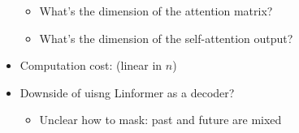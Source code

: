 \documentclass[usenames,dvipsnames,notes,11pt,aspectratio=169,hyperref={colorlinks=true, linkcolor=blue}]{beamer}
\newcommand{\pdfnote}[1]{}
\begin{document}
\begin{frame}
\begin{columns}
\begin{column}{0.7\textwidth}
\begin{itemize}[<+->]
\begin{itemize}
                        \item What's the dimension of the attention matrix?
                            \pdfnote{n x k}
                        \item What's the dimension of the self-attention output?
                            \pdfnote{n x d}
                    \end{itemize}
                \item Computation cost:  (linear in $n$)
                \item Downside of uisng Linformer as a decoder?
                    \begin{itemize}
                        \item Unclear how to mask: past and future are mixed
                    \end{itemize}
            \end{itemize}
        \end{column}
    \end{columns}
\end{frame}

%
%

\end{document}
